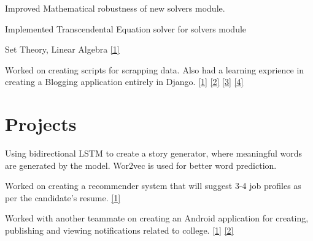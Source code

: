 \documentclass[]{deedy-resume-openfont}
\begin{document}
\begin{minipage}[t]{0.66\textwidth}
\vspace{\topsep} %
\begin{tightemize}
\item Improved Mathematical robustness of new solvers module.
\item Implemented Transcendental Equation solver for solvers module
\item Set Theory, Linear Algebra
\href{https://summerofcode.withgoogle.com/archive/2018/projects/6261947964063744/}{[1]}
\end{tightemize}
\sectionsep

\begin{tightemize}
\item Worked on creating scripts for scrapping data. Also had a learning exprience in creating a Blogging application entirely
in Django.
\href{https://github.com/Yathartha22/farcon_image_scrapper}{[1]}
\href{https://github.com/Yathartha22/quotesBot}{[2]}
\href{https://github.com/Yathartha22/nasa}{[3]}
\href{https://github.com/Yathartha22/myblog}{[4]}
\end{tightemize}
\sectionsep




\section{Projects}

Using bidirectional LSTM to create a story generator, where meaningful words are generated by the model.
Wor2vec is used for better word prediction.
\sectionsep

Worked on creating a recommender system that will suggest 3-4 job profiles as per the candidate's resume.
\href{https://github.com/Yathartha22/Job-Recommender-System}{[1]}
\sectionsep

Worked with another teammate on creating an Android application for creating, publishing and viewing notifications related to college.
\href{https://github.com/Yathartha22/notices-api}{[1]}
\href{https://drive.google.com/file/d/0B5EALEdIC0ktZ1JQRUhCdjZ1Z1NxSkVHT3Mwb3Rab3JtRmQ0/view?usp=sharing}{[2]}
\sectionsep


\end{minipage}
\end{document}
